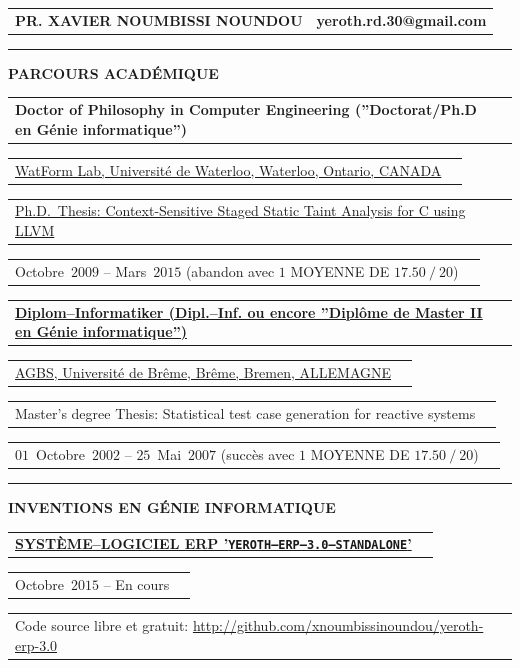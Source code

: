 \documentclass[9pt,a4paper]{article} %
\makeatletter
\newcommand{\myfullacademicname}{PR. XAVIER NOUMBISSI NOUNDOU\xspace}
\newcommand{\headerrow}[2]
{\begin{tabular*}{\linewidth}{l@{\extracolsep{\fill}}r}
	#1 &
	#2 \\
\end{tabular*}}
\newcommand{\headerrowONE}[1]{\headerrow{#1}{}}
\newcommand{\cvitemdate}[2]{#1~$#2$\xspace}
\makeatother
\begin{document}
\thispagestyle{OnlyFirstPage}

\bigskip


\headerrow{\Large \textbf{\myfullacademicname}}
{\Large \textbf{yeroth.rd.30@gmail.com}}

\vspace{1em}


\hrule
\begin{center}
{\large \textbf{PARCOURS ACADÉMIQUE}}
\end{center}

\vspace{0.5em}

\headerrowONE{\textbf{Doctor of Philosophy in Computer Engineering (''Doctorat/Ph.D en Génie informatique'')}}	
\headerrowONE{\href{http://watform.uwaterloo.ca/}{WatForm Lab, Université de Waterloo, Waterloo, Ontario, CANADA}}
\headerrowONE{\href{http://archive.org/details/yeroth-saint}{Ph.D.~Thesis: Context-Sensitive Staged Static Taint Analysis for C using LLVM}}
\headerrowONE{\cvitemdate{Octobre}{2009} -- \cvitemdate{Mars}{2015} (abandon avec $1$ MOYENNE DE $17.50~/~20$)}	
	
\vspace{0.3em}
	
\headerrowONE{\href{http://www.informatik.uni-bremen.de/agbs/qualifikationsarbeiten/diplomarbeiten_e.html}{\textbf{Diplom--Informatiker (Dipl.--Inf. ou encore ''Diplôme de Master II en Génie informatique'')}}}
\headerrowONE{\href{http://www.informatik.uni-bremen.de/agbs/}{AGBS, Université de Brême, Brême, Bremen, ALLEMAGNE}}	
\headerrowONE{Master's degree Thesis: Statistical test case generation for reactive systems}
\headerrowONE{\cvitemdate{$01$~Octobre}{2002} -- \cvitemdate{$25$~Mai}{2007} (succès avec $1$ MOYENNE DE $17.50~/~20$)}	

\vspace{1em}

\hrule
\begin{center}
{\large \textbf{INVENTIONS EN GÉNIE INFORMATIQUE}}
\end{center}

\vspace{0.5em}

\headerrowONE{\href{http://archive.org/details/yeroth-erp-3-0-info-francais}{\textbf{SYSTÈME--LOGICIEL ERP '\texttt{YEROTH--ERP--3.0--STANDALONE}'}}}		
\headerrowONE{\cvitemdate{Octobre}{2015} -- En cours}
\headerrowONE{Code source libre et gratuit: \url{http://github.com/xnoumbissinoundou/yeroth-erp-3.0}}
\end{document}
